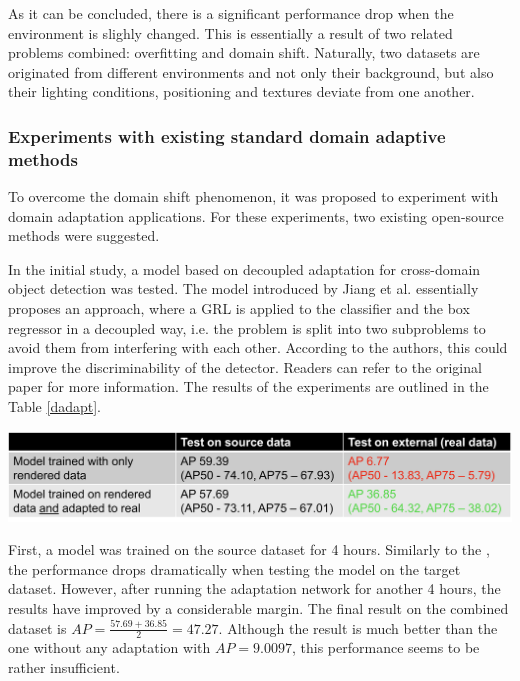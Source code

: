 \documentclass[english, 12pt, a4paper, elec, utf8, a-1b, online]{aaltothesis}
\begin{document}
As it can be concluded, there is a significant performance drop when the environment is slighly changed. This is essentially a result of two related problems combined: overfitting and domain shift. Naturally, two datasets are originated from different environments and not only their background, but also their lighting conditions, positioning and textures deviate from one another. 

\subsubsection{Experiments with existing standard domain adaptive methods}
To overcome the domain shift phenomenon, it was proposed to experiment with domain adaptation applications. For these experiments, two existing open-source methods were suggested. 

In the initial study, a model based on decoupled adaptation for cross-domain object detection \cite{Jiang2021} was tested. The model introduced by Jiang et al. essentially proposes an  approach, where a GRL is applied to the classifier and the box regressor in a decoupled way, i.e. the problem is split into two subproblems to avoid them from interfering with each other. According to the authors, this could improve the discriminability of the detector. Readers can refer to the original paper \cite{Jiang2021} for more information. The results of the experiments are outlined in the Table \ref{dadapt}.

\begin{table}[htb]
	\begin{center}
		\includegraphics[width=14cm]{./dadapt.png}
	\end{center}
	\begin{center}
		\label{dadapt}
	\end{center}
\end{table}
\FloatBarrier

First, a model was trained on the source dataset for 4 hours. Similarly to the , the performance drops dramatically when testing the model on the target dataset. However, after running the adaptation network for another 4 hours, the results have improved by a considerable margin. The final result on the combined dataset is $AP = \frac{57.69+36.85}{2} = 47.27$. Although the result is much better than the one without any adaptation with $AP = 9.0097$, this performance seems to be rather insufficient. 
\end{document}

